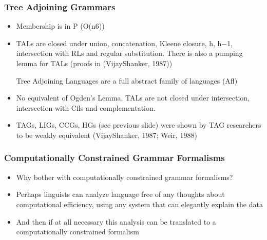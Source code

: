 \documentclass[compress,color=usenames]{beamer}
\begin{document}
\begin{frame}
\frametitle{Tree Adjoining Grammars}

\begin{itemize}

\item Membership is in P (O(n6))


\item TALs are closed under union, concatenation, Kleene closure, h, h$-$1,
intersection with RLs and regular substitution. There is also a pumping
lemma for TALs (proofs in (VijayShanker, 1987))


Tree Adjoining Languages are a full abstract family of languages (Afl)

\item No equivalent of Ogden's Lemma. TALs are not closed under
intersection, intersection with Cfls and complementation.


\item TAGs, LIGs, CCGs, HGs (see previous slide) were shown by TAG
researchers to be weakly equivalent (VijayShanker, 1987; Weir, 1988)

\end{itemize}

\end{frame}

\begin{frame}
\frametitle{Computationally Constrained Grammar Formalisms}

\begin{itemize}


\item Why bother with computationally constrained grammar formalisms?


\item Perhaps linguists can analyze language free of any thoughts about
computational efficiency, using any system that can elegantly explain the
data

\item And then if at all necessary this analysis can be translated to a
computationally constrained formalism

\end{itemize}

\end{frame}
\end{document}
